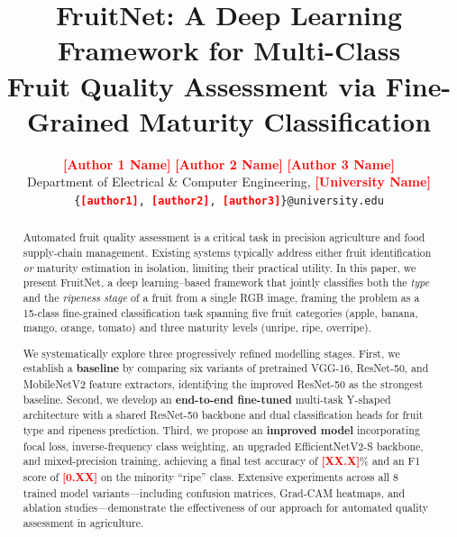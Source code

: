 \documentclass[10pt,twocolumn,letterpaper]{article}
\newcommand{\methodname}{FruitNet}
\newcommand{\placeholder}[1]{\textcolor{red}{\textbf{[#1]}}}
\begin{document}
\title{\methodname: A Deep Learning Framework for Multi-Class\\Fruit Quality Assessment via Fine-Grained Maturity Classification}

\author{
  \placeholder{Author 1 Name} \quad
  \placeholder{Author 2 Name} \quad
  \placeholder{Author 3 Name} \\
  Department of Electrical \& Computer Engineering, \placeholder{University Name}\\
  {\tt\small \{\placeholder{author1}, \placeholder{author2}, \placeholder{author3}\}@university.edu}
}

\maketitle

\begin{abstract}
Automated fruit quality assessment is a critical task in precision agriculture and food supply-chain management.
Existing systems typically address either fruit identification \emph{or} maturity estimation in isolation, limiting their practical utility.
In this paper, we present \methodname{}, a deep learning--based framework that jointly classifies both the \emph{type} and the \emph{ripeness stage} of a fruit from a single RGB image, framing the problem as a 15-class fine-grained classification task spanning five fruit categories (apple, banana, mango, orange, tomato) and three maturity levels (unripe, ripe, overripe).

We systematically explore three progressively refined modelling stages.
First, we establish a \textbf{baseline} by comparing six variants of pretrained VGG-16, ResNet-50, and MobileNetV2 feature extractors, identifying the improved ResNet-50 as the strongest baseline.
Second, we develop an \textbf{end-to-end fine-tuned} multi-task Y-shaped architecture with a shared ResNet-50 backbone and dual classification heads for fruit type and ripeness prediction.
Third, we propose an \textbf{improved model} incorporating focal loss, inverse-frequency class weighting, an upgraded EfficientNetV2-S backbone, and mixed-precision training, achieving a final test accuracy of \placeholder{XX.X}\% and an F1 score of \placeholder{0.XX} on the minority ``ripe'' class.
Extensive experiments across all 8 trained model variants---including confusion matrices, Grad-CAM heatmaps, and ablation studies---demonstrate the effectiveness of our approach for automated quality assessment in agriculture.
\end{abstract}
\end{document}
